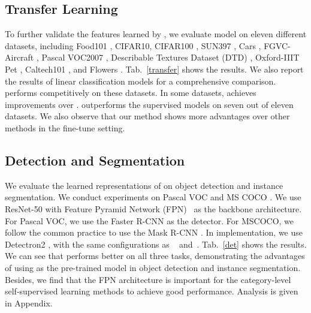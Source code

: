 \documentclass[10pt,twocolumn,letterpaper]{article}
\begin{document}
\subsection{Transfer Learning} To further validate the features learned by \ourmethod, we evaluate \ourmethod model on eleven different datasets, including Food101 \cite{bossard14}, CIFAR10, CIFAR100 \cite{krizhevsky2009learning}, SUN397 \cite{xiao2010sun}, Cars \cite{Krause2013CollectingAL}, FGVC-Aircraft \cite{maji13fine-grained}, Pascal VOC2007 \cite{Everingham2009ThePV}, Describable Textures Dataset (DTD) \cite{cimpoi14describing}, Oxford-IIIT Pet \cite{Parkhi2012CatsAD}, Caltech101 \cite{Li2004LearningGV}, and Flowers \cite{nilsback2008automated}. Tab.~\ref{transfer} shows the results. We also report the results of linear classification models for a comprehensive comparison. \ourmethod performs competitively on these datasets. In some datasets, \ourmethod  achieves improvements over . \ourmethod outperforms the supervised models on seven out of eleven datasets. We also observe that our method shows more advantages over other methods in the fine-tune setting.



\subsection{Detection and Segmentation} We evaluate the learned representations of \ourmethod on object detection and instance segmentation. We conduct experiments on Pascal VOC \cite{Everingham2009ThePV} and MS COCO \cite{lin2014microsoft}.
We use ResNet-50 with Feature Pyramid Network (FPN)~\cite{lin2017feature} as the backbone architecture. For Pascal VOC, we use the Faster R-CNN \cite{ren2015faster} as the detector. For MSCOCO, we follow the common practice to use the Mask R-CNN \cite{he2017mask}. In implementation, we use Detectron2 \cite{wu2019detectron2}, with the same configurations as
~\cite{tian2020makes} and~\cite{wang2020DenseCL}. 
Tab.~\ref{det} shows the results. We can see that \ourmethod performs better on all three tasks, demonstrating the advantages of using \ourmethod as the pre-trained model in object detection and instance segmentation. Besides, we find that the FPN architecture is important for the category-level self-supervised learning methods to achieve good performance. Analysis is given in Appendix.
\end{document}
